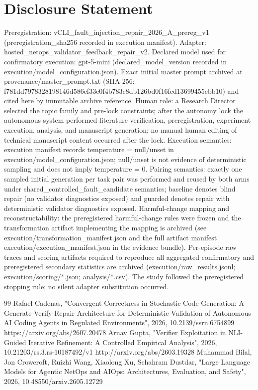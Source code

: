 \documentclass[conference]{IEEEtran}
\begin{document}
\section*{Disclosure Statement}
Preregistration: vCLI\_fault\_injection\_repair\_2026\_A\_prereg\_v1 (preregistration\_sha256 recorded in execution manifest). Adapter: hosted\_netops\_validator\_feedback\_repair\_v2. Declared model used for confirmatory execution: gpt-5-mini (declared\_model\_version recorded in execution/model\_configuration.json). Exact initial master prompt archived at provenance/master\_prompt.txt (SHA-256: f781dd79\allowbreak{}78328198\allowbreak{}146d586c\allowbreak{}f33e0f4b\allowbreak{}783c8db1\allowbreak{}26bd0f16\allowbreak{}fcd13699\allowbreak{}455ebb10) and cited here by immutable archive reference. Human role: a Research Director selected the topic family and pre-lock constraints; after the autonomy lock the autonomous system performed literature verification, preregistration, experiment execution, analysis, and manuscript generation; no manual human editing of technical manuscript content occurred after the lock. Execution semantics: execution manifest records temperature = null/unset in execution/model\_configuration.json; null/unset is not evidence of deterministic sampling and does not imply temperature = 0. Pairing semantics: exactly one sampled initial generation per task pair was performed and reused by both arms under shared\_controlled\_fault\_candidate semantics; baseline denotes blind repair (no validator diagnostics exposed) and guarded denotes repair with deterministic validator diagnostics exposed. Harmful-change mapping and reconstructability: the preregistered harmful-change rules were frozen and the transformation artifact implementing the mapping is archived (see execution/transformation\_manifest.json and the full artifact manifest execution/execution\_manifest.json in the evidence bundle). Per-episode raw traces and scoring artifacts required to reproduce all aggregated confirmatory and preregistered secondary statistics are archived (execution/raw\_results.jsonl; execution/scoring/*.json; analysis/*.csv). The study followed the preregistered stopping rule; no silent adapter substitution occurred.

\begin{thebibliography}{99}
 Rafael Cadenas, "Convergent Correctness in Stochastic Code Generation: A Generate-Verify-Repair Architecture for Deterministic Validation of Autonomous AI Coding Agents in Regulated Environments", 2026, 10.2139/ssrn.6754899
 https://arxiv.org/abs/2607.20478
 Arnav Gupta, "Verifier Exploitation in NLI-Guided Iterative Refinement: A Controlled Empirical Analysis", 2026, 10.21203/rs.3.rs-10187492/v1
 http://arxiv.org/abs/2603.19328
 Muhammad Bilal, Jon Crowcroft, Ruizhi Wang, Xiaolong Xu, Schahram Dustdar, "Large Language Models for Agentic NetOps and AIOps: Architectures, Evaluation, and Safety", 2026, 10.48550/arxiv.2605.12729
\end{thebibliography}
\end{document}
